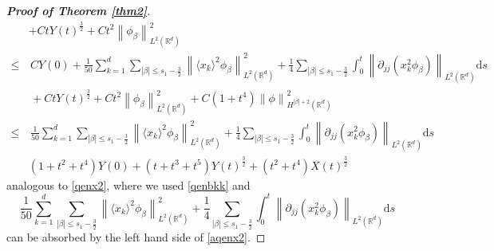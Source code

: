 \documentclass[10pt,twoside,a4paper]{article}
\numberwithin{equation}{section}\allowdisplaybreaks
\def\leq{\leqslant}
\begin{document}
\begin{proof}[\textbf{Proof of Theorem \ref{thm2}}]
\begin{align}
	&+C tY(t)^{\frac 32}+Ct^2 \left\| \phi_{\beta}\right\|_{L^2(\mathbb{R}^d)}^2\nonumber \\
	\leq &\,C Y(0) +\frac {1}{50} \sum_{k=1}^d \sum_{|\beta| \leq s_1-\frac32}  \left\|  \langle x_k\rangle^2 \phi_{\beta}\right\|_{L^2(\mathbb{R}^d)}^{2}+\frac{1}4\sum_{|\beta| \leq s_1-\frac32}\int_0^t \left\| \partial_{jj}\left( x_k^2
	\phi_\beta\right)\right\|_{L^2(\mathbb{R}^d)}\mathrm{d}s\nonumber\\
	&\,+ CtY(t)^{\frac 32}+Ct^2 \left\| \phi_{\beta}\right\|_{L^2(\mathbb{R}^d)}^2+C(1+t^4)\left\|  \phi\right\|_{H^{|\beta|+2}(\mathbb{R}^d)} ^2  \nonumber\\
	\leq & \,	\frac {1}{50} \sum_{k=1}^d \sum_{|\beta| \leq s_1-\frac32}  \left\|  \langle x_k\rangle^2 \phi_{\beta}\right\|_{L^2(\mathbb{R}^d)}^{2}+\frac{1}4\sum_{|\beta| \leq s_1-\frac32}\int_0^t \left\| \partial_{jj}\left( x_k^2
	\phi_\beta\right)\right\|_{L^2(\mathbb{R}^d)}\mathrm{d}s\nonumber\\
	& (1+t^2+t^4) Y(0) +(t+t^3+t^5)  Y(t)^{\frac 32} +(t^2+t^4)  X(t)^{\frac 32}
\end{align}
analogous to \eqref{qenx2}, where we used \eqref{qenbkk} and
 $$ 	\frac {1}{50} \sum_{k=1}^d \sum_{|\beta| \leq s_1-\frac32}  \left\|  \langle x_k\rangle^2 \phi_{\beta}\right\|_{L^2(\mathbb{R}^d)}^{2}+\frac{1}4\sum_{|\beta| \leq s_1-\frac32}\int_0^t \left\| \partial_{jj}\left( x_k^2
\phi_\beta\right)\right\|_{L^2(\mathbb{R}^d)}\mathrm{d}s$$ can be absorbed by the left hand side of \eqref{aqenx2}. 


\end{proof}
\end{document}
